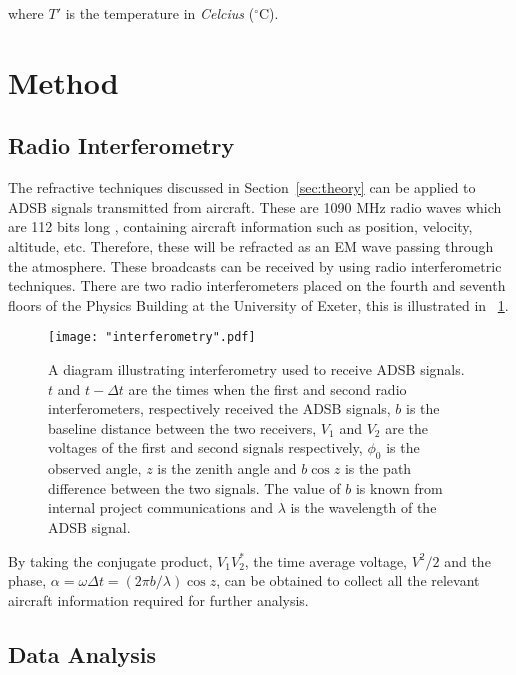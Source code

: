 \documentclass{article}
\newcommand{\figref}[2][\figurename~]{#1\ref{#2}}
\newcommand{\secref}[2][Section~]{#1\ref{#2}}
\begin{document}
\vspace{2mm}
\noindent
where $T'$ is the temperature in \textit{Celcius} ($^{\circ}$C).

\section{Method}
\label{sec:method}

\subsection{Radio Interferometry}
\label{ssec:radio-interferometry}

The refractive techniques discussed in \secref{sec:theory} can be applied to ADSB signals transmitted from aircraft. These are 1090 MHz radio waves which are 112 bits long \cite{Book02}, containing aircraft information such as position, velocity, altitude, etc. Therefore, these will be refracted as an EM wave passing through the atmosphere. These broadcasts can be received by using radio interferometric techniques. There are two radio interferometers placed on the fourth and seventh floors of the Physics Building at the University of Exeter, this is illustrated in \figref{fig:interferometry}.

\begin{figure}[h]
\centering
\texttt{[image: "interferometry".pdf]}
\caption{A diagram illustrating interferometry used to receive ADSB signals. $t$ and $t - \Delta t$ are the times when the first and second radio interferometers, respectively received the ADSB signals, $b$ is the baseline distance between the two receivers, $V_1$ and $V_2$ are the voltages of the first and second signals respectively, $\phi_0$ is the observed angle, $z$ is the zenith angle and $b \cos z$ is the path difference between the two signals. The value of $b$ is known from internal project communications and $\lambda$ is the wavelength of the ADSB signal.}
\label{fig:interferometry}
\end{figure}

\vspace{2mm}
\noindent
By taking the conjugate product, $V_1 V_2^*$, the time average voltage, $V^2/2$ and the phase, $\alpha = \omega \Delta t = (2 \pi b / \lambda) \cos z$, can be obtained to collect all the relevant aircraft information required for further analysis.


\subsection{Data Analysis}
\label{ssec:data-analysis}
\end{document}
